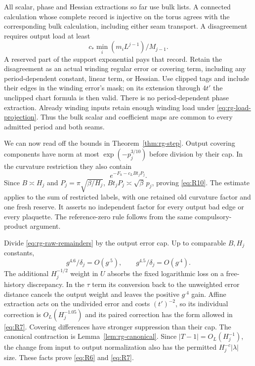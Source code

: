 All scalar, phase and Hessian extractions so far use bulk lists.  A
connected calculation whose complete record is injective on the torus
agrees with the corresponding bulk calculation, including either seam
transport.  A disagreement requires output load at least
\[
                c_*\min_i(m_iL^{j-1})/M_{j-1}.
\]
A reserved part of the support exponential pays that record.  Retain
the disagreement as an actual winding regular error or covering term,
including any period-dependent constant, linear term, or Hessian.
Use clipped tags and include their edges in the winding error's mask;
on its extension through $4t'$ the unclipped chart formula is then
valid.  There is no period-dependent phase extraction.  Already winding
inputs retain enough winding load under
\eqref{eq:rg-load-projection}.  Thus the bulk scalar and coefficient
maps are common to every admitted period and both seams.

We can now read off the bounds in Theorem~\ref{thm:rg-step}.  Output
covering components have norm at most $\exp(-p_j^{3/10})$ before division
by their cap.  In the curvature restriction they also contain
\[
                       e^{-F_h-c_LBt_jP_j}.
\]
Since $B\asymp H_j$ and $P_j=\pi\sqrt{\beta/H_j}$,
$Bt_jP_j\asymp\sqrt\beta\,p_j$, proving \eqref{eq:R10}.  The estimate
applies to the sum of restricted labels, with one retained old
curvature factor and one fresh reserve.  It asserts no independent
factor for every output bad edge or every plaquette.  The reference-zero
rule follows from the same compulsory-product argument.

Divide \eqref{eq:rg-raw-remainders} by the output error cap.  Up to
comparable $B,H_j$ constants,
\[
           g^{4.6}/\delta_j=O(g^{.5}),\qquad
           g^{4.5}/\delta_j=O(g^{.4}).
\]
The additional $H_j^{-1/2}$ weight in $U$ absorbs the fixed logarithmic
loss on a free-history discrepancy.  In the $\tau$ term its conversion
back to the unweighted error distance cancels the output weight and
leaves the positive $g^{.4}$ gain.  Affine extraction acts on the
undivided error and costs $(t')^{-2}$, so its individual correction is
$O_L(H_j^{-1.05})$ and its paired correction has the form allowed in
\eqref{eq:R7}.  Covering differences have stronger suppression than
their cap.  The canonical contraction is
Lemma~\ref{lem:rg-canonical}.  Since $|T-1|=O_L(H_j^{-1})$, the change
from input to output normalization also has the permitted
$H_j^{-c}|\lambda|$ size.  These facts prove \eqref{eq:R6} and
\eqref{eq:R7}.

